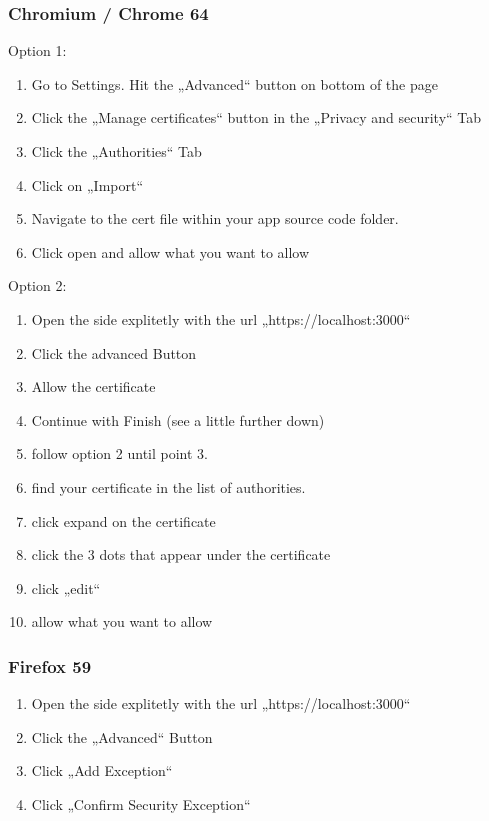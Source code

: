 \documentclass[10pt,a4paper,landscape]{article}
\begin{document}
\subsubsection{Chromium / Chrome 64}
Option 1:\\
\begin{enumerate}
        \item
                Go to Settings. Hit the „Advanced“ button on bottom of the page
        \item
                Click the „Manage certificates“ button in the „Privacy and security“ Tab
        \item
                Click the „Authorities“ Tab
        \item
                Click on „Import“
        \item
                Navigate to the cert file within your app source code folder.
        \item
                Click open and allow what you want to allow
\end{enumerate}
Option 2:\\
\begin{enumerate}
        \item
                Open the side explitetly with the url „https://localhost:3000“
        \item
                Click the advanced Button
        \item
                Allow the certificate
        \item 
                Continue with Finish (see a little further down)
        \item
                follow option 2 until point 3.
        \item
                find your certificate in the list of authorities. 
        \item
                click expand on the certificate 
        \item 
                click the 3 dots that appear under the certificate
        \item 
                click „edit“
        \item 
                allow what you want to allow
\end{enumerate}
\subsubsection{Firefox 59}
\begin{enumerate}
        \item
                Open the side explitetly with the url „https://localhost:3000“
        \item
                Click the „Advanced“ Button
        \item 
                Click „Add Exception“
        \item
                Click „Confirm Security Exception“
\end{enumerate}
\end{document}
